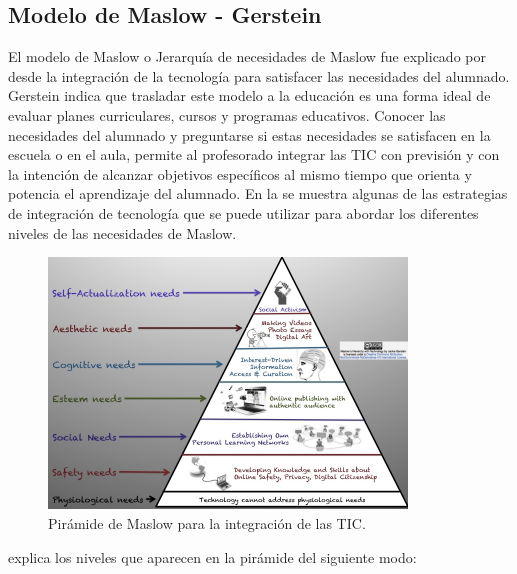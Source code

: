 \documentclass[spanish]{textolivre}
\begin{document}
\subsection{Modelo de Maslow - Gerstein}\label{sec-modelo}
El modelo de Maslow o Jerarquía de necesidades de Maslow fue explicado por \textcite{gerstein_addressing_2014} desde la integración de la tecnología para satisfacer las necesidades del alumnado. Gerstein indica que trasladar este modelo a la educación es una forma ideal de evaluar planes curriculares, cursos y programas educativos. Conocer las necesidades del alumnado y preguntarse si estas necesidades se satisfacen en la escuela o en el aula, permite al profesorado integrar las TIC con previsión y con la intención de alcanzar objetivos específicos al mismo tiempo que orienta y potencia el aprendizaje del alumnado. En la  se muestra algunas de las estrategias de integración de tecnología que se puede utilizar para abordar los diferentes niveles de las necesidades de Maslow. 

\begin{figure}[h!]
 \centering
 \includegraphics[width=0.85\textwidth]{Fig2.png}
 \caption{Pirámide de Maslow para la integración de las TIC.}
 \label{fig02}
\end{figure}

\textcite{gerstein_addressing_2014} explica los niveles que aparecen en la pirámide del siguiente modo:
\end{document}
